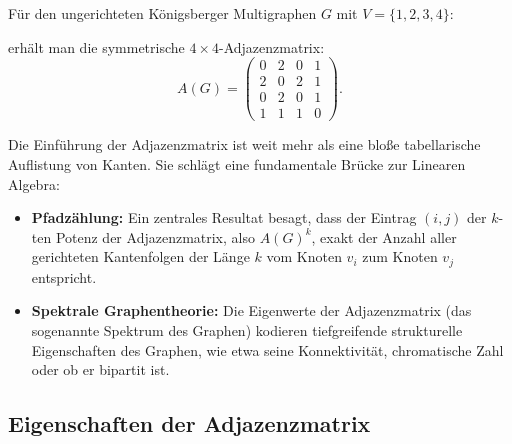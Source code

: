 \begin{math-stroke}
Für den ungerichteten Königsberger Multigraphen $G$ mit $V = \{1, 2, 3, 4\}$:

\begin{center}
\end{center}

erhält man die symmetrische $4 \times 4$-Adjazenzmatrix:
\[
A(G) = \begin{pmatrix}
0 & 2 & 0 & 1 \\
2 & 0 & 2 & 1 \\
0 & 2 & 0 & 1 \\
1 & 1 & 1 & 0
\end{pmatrix}.
\]
\end{math-stroke}

\begin{didactic-insight}
Die Einführung der Adjazenzmatrix ist weit mehr als eine bloße tabellarische Auflistung von Kanten. Sie schlägt eine fundamentale Brücke zur Linearen Algebra:
\begin{itemize}
    \item \textbf{Pfadzählung:} Ein zentrales Resultat besagt, dass der Eintrag $(i,j)$ der $k$-ten Potenz der Adjazenzmatrix, also $A(G)^k$, exakt der Anzahl aller gerichteten Kantenfolgen der Länge $k$ vom Knoten $v_i$ zum Knoten $v_j$ entspricht.
    \item \textbf{Spektrale Graphentheorie:} Die Eigenwerte der Adjazenzmatrix (das sogenannte Spektrum des Graphen) kodieren tiefgreifende strukturelle Eigenschaften des Graphen, wie etwa seine Konnektivität, chromatische Zahl oder ob er bipartit ist.
\end{itemize}
\end{didactic-insight}

\subsection{Eigenschaften der Adjazenzmatrix}

